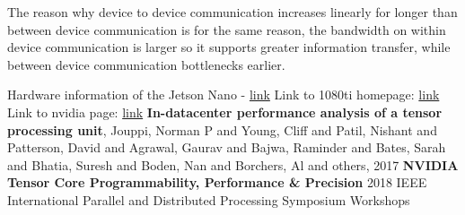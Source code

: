 \documentclass{article}
\begin{document}
The reason why device to device communication increases linearly for longer than between device communication is for the same reason, the bandwidth on within
device communication is larger so it supports greater information transfer, while between device communication bottlenecks earlier.




  




\begin{thebibliography}{1}

 Hardware information of the Jetson Nano -
  \href{https://developer.download.nvidia.com/assets/embedded/secure/jetson/Nano/docs/JetsonNano_DataSheet_DS09366001v1.0.pdf?iaSvUlG13V9tO_rXL4A6TSmWGgvF2rSYMQNAA7H0PGswJ3Ce29p9QHbgqQYfW539zMaLP0UgEZ4sk1uQuZyNt_27VZofFR1NN5A0AFbZ2ZgMVtxj01KRbMQBTwmpzEvydG9r0NRMDTGXC75N0W2yAn2pO9rc-qiop05-HERWP5O6ACDsok9m7cfYjxUlxQ}{link}
 Link to 1080ti homepage: \href{https://www.nvidia.com/en-sg/geforce/products/10series/geforce-gtx-1080-ti/}{link}
 Link to nvidia page: \href{https://www.nvidia.com/en-us/data-center/tensor-cores/}{link}
 {\textbf{In-datacenter performance analysis of a tensor processing unit}}, {Jouppi, Norman P and Young, Cliff and Patil, Nishant and Patterson, David and Agrawal, Gaurav and Bajwa, Raminder and Bates, Sarah and Bhatia, Suresh and Boden, Nan and Borchers, Al and others}, {2017}
 \textbf{NVIDIA Tensor Core Programmability, Performance \& Precision} 2018 IEEE International Parallel and Distributed Processing Symposium Workshops

\end{thebibliography}
\end{document}

